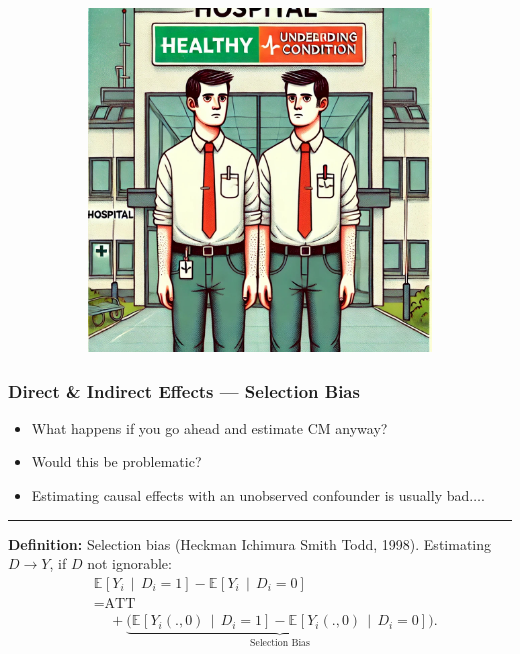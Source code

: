 \documentclass[dvipsnames]{beamer} %
\newcommand{\Egiven}[3][]{\mathbb{E}_{#1} \left[ #2 \, \middle\vert \, #3 \right]} %
\begin{document}
\begin{frame}[noframenumbering]
\begin{figure}[h!]
\begin{subfigure}[c]{0.475\textwidth}
            \includegraphics[width=\textwidth]{
                presentation-files/headlines/health-differences.jpg}
        \end{subfigure}
    \end{figure}
\end{frame}
\begin{frame}
    \frametitle{Direct \& Indirect Effects --- Selection Bias}
    \begin{itemize}
        \item What happens if you go ahead and estimate CM anyway?
        \item Would this be problematic?
        \item Estimating causal effects with an unobserved confounder is usually bad$\hdots$.
    \end{itemize}
    \par\noindent\rule{\textwidth}{0.4pt}
    \vskip0.25cm
    \textbf{Definition:} Selection bias (Heckman Ichimura Smith Todd, 1998).
    \vskip0.25cm
    Estimating $D \to Y$, if $D$ not ignorable:
    \begin{align*}
        &\Egiven{ Y_i}{D_i =1} - \Egiven{ Y_i}{D_i =0} \\
        &= \text{ATT} \\
        &\;\;\;\; + \underbrace{\Big(
            \Egiven{ Y_i(.,0)}{D_i =1} - \Egiven{ Y_i(.,0)}{D_i =0} \Big)}_{
                \text{Selection Bias}}.
    \end{align*}
    \vskip1.125cm
\end{frame}
\end{document}
